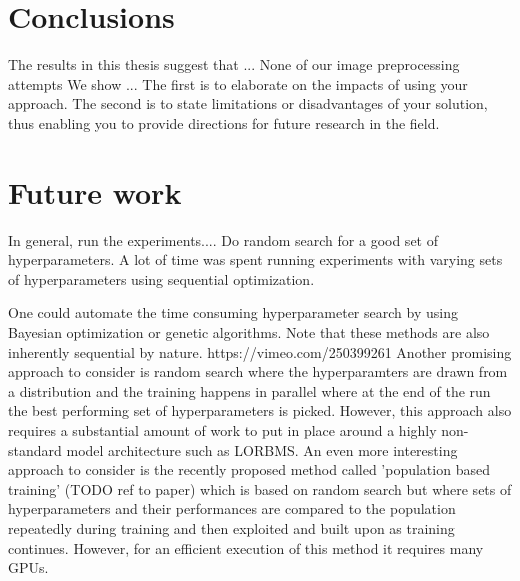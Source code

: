 \documentclass[12pt,a4paper]{article}
\begin{document}
\section{Conclusions}\label{sec:conclusion}
The results in this thesis suggest that ...
None of our image preprocessing attempts
We show ...
The first is
to elaborate on the impacts of using your approach. The
second is to state limitations or disadvantages of your solution,
thus enabling you to provide directions for future
research in the field.


\section{Future work}
In general, run the experiments.... Do random search for a good set of hyperparameters. A lot of time was spent running experiments with varying sets of hyperparameters using sequential optimization.

\par One could automate the time consuming hyperparameter search by using Bayesian optimization or genetic algorithms. Note that these methods are also inherently sequential by nature. https://vimeo.com/250399261
Another promising approach to consider is random search where the hyperparamters are drawn from a distribution and the training happens in parallel where at the end of the run the best performing set of hyperparameters is picked. However, this approach also requires a substantial amount of work to put in place around a highly non-standard model architecture such as LORBMS. An even more interesting approach to consider is the recently proposed method called 'population based training' (TODO ref to paper) which is based on random search but where sets of hyperparameters and their performances are compared to the population repeatedly during training and then exploited and built upon as training continues. However, for an efficient execution of this method it requires many GPUs. 
\end{document}
